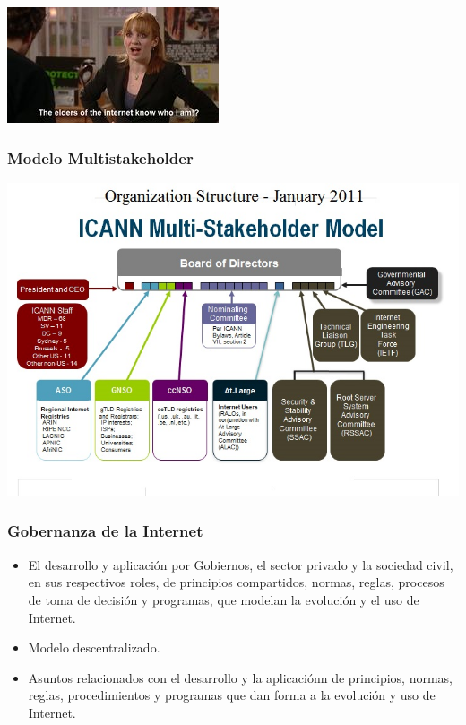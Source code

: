\documentclass{beamer}
\begin{document}
\begin{frame}
	\begin{center}
	            \includegraphics[scale=0.90]{../img/the-elders-of-internet.jpg}
	\end{center}	
\end{frame}


\begin{frame}
\frametitle{Modelo Multistakeholder}
	\begin{center}
		\includegraphics[scale=0.50]{../img/Icann-Organization-Structure-January-2011.jpg}
	\end{center}

\end{frame}

\begin{frame}
\frametitle{Gobernanza de la Internet}
	\begin{itemize}
		\item \pause El desarrollo y aplicaci\'on por Gobiernos, el sector privado y la sociedad civil, en sus respectivos roles, de principios compartidos, normas, reglas, procesos de toma de decisi\'on y programas, que modelan la evoluci\'on y el uso de Internet.
		\item \pause Modelo descentralizado.
		\item \pause Asuntos relacionados con el desarrollo y la aplicaci\'onn de principios, normas, reglas, procedimientos y programas que dan forma a la evoluci\'on y uso de Internet.
     \end{itemize} 
\end{frame}
\end{document}
